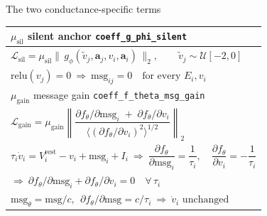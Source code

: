 \documentclass[aspectratio=169]{beamer}
\begin{document}
\begin{frame}{The two conductance-specific terms}
\vspace*{0.45cm}
\centering\scriptsize
\begin{tabular}{@{}l@{}}
\toprule
$\mu_{\mathrm{sil}}$ \quad silent anchor \quad \texttt{coeff\_g\_phi\_silent} \\
\midrule
$\mathcal{L}_{\mathrm{sil}} = \mu_{\mathrm{sil}}
 \bigl\lVert\, g_\phi(\tilde v_j, \mathbf{a}_j, v_i, \mathbf{a}_i) \,\bigr\rVert_2 ,
 \qquad \tilde v_j \sim \mathcal{U}[-2, 0]$ \\[6pt]
$\mathrm{relu}(v_j) = 0 \ \Rightarrow\ \mathrm{msg}_{ij} = 0
 \quad\text{for every } E_i, v_i$ \\
\midrule
$\mu_{\mathrm{gain}}$ \quad message gain \quad \texttt{coeff\_f\_theta\_msg\_gain} \\
\midrule
$\mathcal{L}_{\mathrm{gain}} = \mu_{\mathrm{gain}}
 \left\lVert \dfrac{\partial f_\theta/\partial \mathrm{msg}_i
   \;+\; \partial f_\theta/\partial v_i}
  {\bigl\langle (\partial f_\theta/\partial v_i)^2 \bigr\rangle^{1/2}}
 \right\rVert_2$ \\[8pt]
$\tau_i \dot v_i = V^{\mathrm{rest}}_i - v_i + \mathrm{msg}_i + I_i
 \ \Rightarrow\
 \dfrac{\partial f_\theta}{\partial \mathrm{msg}_i} = \dfrac{1}{\tau_i},\quad
 \dfrac{\partial f_\theta}{\partial v_i} = -\dfrac{1}{\tau_i}$ \\[4pt]
$\Rightarrow\ \partial f_\theta/\partial \mathrm{msg}_i
 + \partial f_\theta/\partial v_i = 0 \quad \forall\, \tau_i$ \\[6pt]
$\mathrm{msg}_\theta = \mathrm{msg}/c,\ \
 \partial f_\theta/\partial \mathrm{msg} = c/\tau_i
 \ \Rightarrow\ \dot v_i \text{ unchanged}$ \\
\bottomrule
\end{tabular}
\end{frame}
\end{document}
